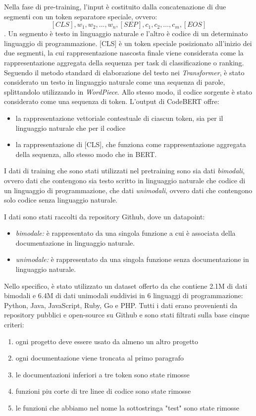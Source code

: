 \documentclass[../../Thesis.tex]{subfiles}
\begin{document}
Nella fase di pre-training, l'input è costituito dalla concatenazione di due segmenti con un token separatore speciale, ovvero: $$[CLS], w_1, w_2, \ldots, w_n, [SEP], c_1, c_2, \ldots, c_m, [EOS]$$. Un segmento è testo in linguaggio naturale e l'altro è codice di un determinato linguaggio di programmazione. [CLS] è un token speciale posizionato all'inizio dei due segmenti, la cui rappresentazione nascosta finale viene considerata come la rappresentazione aggregata della sequenza per task di classificazione o ranking. Seguendo il metodo standard di elaborazione del testo nei \textit{Transformer}, è stato considerato un testo in linguaggio naturale come una sequenza di parole, splittandolo utilizzando in \textit{WordPiece}. Allo stesso modo, il codice sorgente è stato considerato come una sequenza di token.
L'output di CodeBERT offre: 
\begin{itemize}
    \item la rappresentazione vettoriale contestuale di ciascun token, sia per il linguaggio naturale che per il codice
    \item la rappresentazione di [CLS], che funziona come rappresentazione aggregata della sequenza, allo stesso modo che in BERT.
\end{itemize}
I dati di training che sono stati utilizzati nel pretraining sono sia dati \emph{bimodali}, ovvero dati che contengono sia testo scritto in linguaggio naturale che codice di un linguaggio di programmazione, che dati \emph{unimodali}, ovvero dati che contengono solo codice senza linguaggio naturale. 

I dati sono stati raccolti da repository Github, dove un datapoint:
\begin{itemize}
    \item \emph{bimodale:} è rappresentato da una singola funzione a cui è associata della documentazione in linguaggio naturale.
    \item \emph{unimodale:} è rappresentato da una singola funzione senza documentazione in 
    linguaggio naturale.
\end{itemize}
Nello specifico, è stato utilizzato un dataset offerto da \cite{CodeBERTDataset} che contiene 2.1M di dati bimodali e 6.4M di dati unimodali suddivisi in 6 linguaggi di programmazione: Python, Java, JavaScript, Ruby, Go e PHP. Tutti i dati erano provenienti da repository pubblici e open-source su Github e sono stati filtrati sulla base cinque criteri:
\begin{enumerate}
    \item ogni progetto deve essere usato da almeno un altro progetto 
    \item ogni documentazione viene troncata al primo paragrafo
    \item le documentazioni inferiori a tre token sono state rimosse
    \item funzioni piu corte di tre linee di codice sono state rimosse
    \item le funzioni che abbiamo nel nome la sottostringa "test" sono state rimosse
\end{enumerate}
\end{document}
